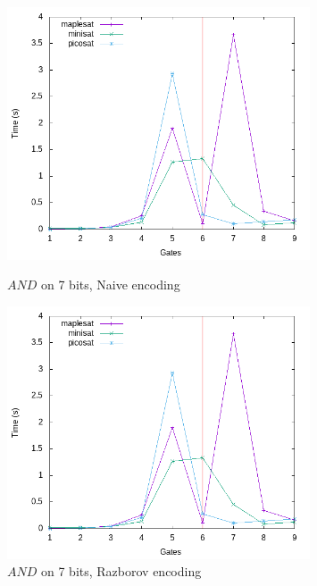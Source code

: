 \documentclass{article}
\begin{document}
\begin{figure}[h!]
\centering

  \includegraphics[width=0.8\textwidth]{images/times/7and_naive.png}  
  \caption{$AND$ on 7 bits, Naive encoding}
  \includegraphics[width=0.8\textwidth]{images/times/7and_raz.png}  
  \caption{$AND$ on 7 bits, Razborov encoding}
\end{figure}
\end{document}
